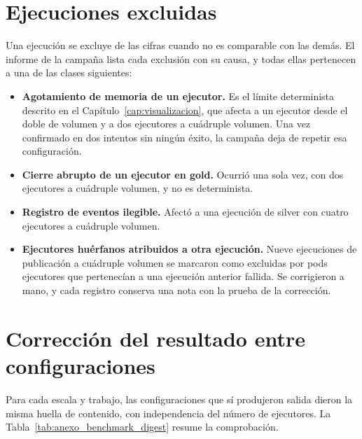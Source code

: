 \section{Ejecuciones excluidas}
\label{sec:anexo_benchmark_excluidas}

Una ejecución se excluye de las cifras cuando no es comparable con las
demás. El informe de la campaña lista cada exclusión con su causa, y todas
ellas pertenecen a una de las clases siguientes:

\begin{itemize}
  \item \textbf{Agotamiento de memoria de un ejecutor.} Es el límite
  determinista descrito en el Capítulo~\ref{cap:visualizacion}, que afecta
  a un ejecutor desde el doble de volumen y a dos ejecutores a cuádruple
  volumen. Una vez confirmado en dos intentos sin ningún éxito, la campaña
  deja de repetir esa configuración.
  \item \textbf{Cierre abrupto de un ejecutor en gold.} Ocurrió una sola vez,
  con dos ejecutores a cuádruple volumen, y no es determinista.
  \item \textbf{Registro de eventos ilegible.} Afectó a una ejecución de
  silver con cuatro ejecutores a cuádruple volumen.
  \item \textbf{Ejecutores huérfanos atribuidos a otra ejecución.} Nueve
  ejecuciones de publicación a cuádruple volumen se marcaron como excluidas
  por pods ejecutores que pertenecían a una ejecución anterior fallida. Se
  corrigieron a mano, y cada registro conserva una nota con la prueba de la
  corrección.
\end{itemize}

\section{Corrección del resultado entre configuraciones}
\label{sec:anexo_benchmark_correccion}

Para cada escala y trabajo, las configuraciones que sí produjeron salida
dieron la misma huella de contenido, con independencia del número de
ejecutores. La Tabla~\ref{tab:anexo_benchmark_digest} resume la comprobación.

